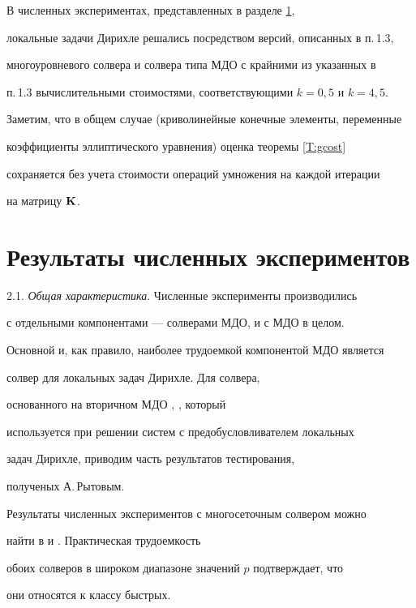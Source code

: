 В численных экспериментах, представленных в разделе \ref{s:exper}, 


локальные задачи Дирихле решались посредством версий, описанных в п.\,1.3,


многоуровневого солвера и солвера типа МДО с крайними из указанных в


п.\,1.3 вычислительными стоимостями, соответствующими $k=0{,}5$ и $k=4{,}5$.


Заметим, что в общем случае (криволинейные конечные элементы, переменные


коэффициенты эллиптического уравнения) оценка теоремы \ref{T:gcost} 


сохраняется без учета стоимости операций умножения на каждой итерации 


на матрицу ${\bold K}$.








\section{Результаты численных экспериментов}\label{s:exper}


\label{IPCG}





2.1. {\it Общая характеристика}. Численные эксперименты производились 


с отдельными компонентами --- солверами МДО, и с МДО в целом.





Основной и, как правило, наиболее трудоемкой компонентой МДО является 


солвер для локальных задач Дирихле. Для солвера,


основанного на вторичном МДО \cite{K2001}, \cite{K2002}, который


используется при решении систем с предобусловливателем локальных


задач Дирихле, приводим часть результатов тестирования,


полученых А.\,Рытовым.


Результаты численных экспериментов с многосеточным солвером можно


найти в \cite{B2002} и \cite{KXA2002}. Практическая трудоемкость


обоих солверов в широком диапазоне значений $p$ подтверждает, что


они относятся к классу быстрых.






